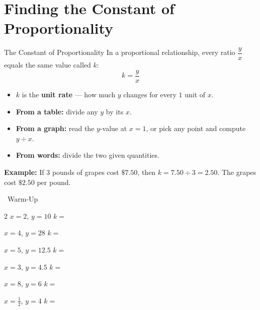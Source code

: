 \section{Finding the Constant of Proportionality}

\begin{quickReview}{The Constant of Proportionality}
In a proportional relationship, every ratio $\dfrac{y}{x}$ equals the same value called \textbf{$k$}:
$$k = \frac{y}{x}$$

\begin{itemize}[leftmargin=*]
    \item $k$ is the \textbf{unit rate} --- how much $y$ changes for every $1$ unit of $x$.
    \item \textbf{From a table:} divide any $y$ by its $x$.
    \item \textbf{From a graph:} read the $y$-value at $x = 1$, or pick any point and compute $y \div x$.
    \item \textbf{From words:} divide the two given quantities.
\end{itemize}

\medskip
\textbf{Example:} If $3$ pounds of grapes cost $\$7.50$, then $k = 7.50 \div 3 = 2.50$. The grapes cost $\$2.50$ per pound.
\end{quickReview}

\begin{practiceBox}[funGreen]{\faSun~Warm-Up}


\begin{multicols}{2}
\prob $x = 2$, $y = 10$ \quad $k = $ \answerBlank[2cm]

\prob $x = 4$, $y = 28$ \quad $k = $ \answerBlank[2cm]

\prob $x = 5$, $y = 12.5$ \quad $k = $ \answerBlank[2cm]

\prob $x = 3$, $y = 4.5$ \quad $k = $ \answerBlank[2cm]

\prob $x = 8$, $y = 6$ \quad $k = $ \answerBlank[2cm]

\prob $x = \frac{1}{2}$, $y = 4$ \quad $k = $ \answerBlank[2cm]
\end{multicols}
\end{practiceBox}


